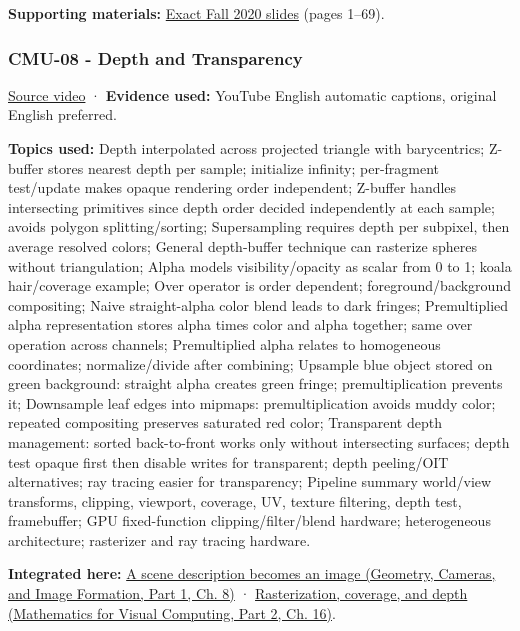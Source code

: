 \textbf{Supporting materials:} \href{https://15462.courses.cs.cmu.edu/fall2020content/lectures/07_texture/07_texture_slides.pdf}{Exact Fall 2020 slides} (pages 1--69).

\subsubsection{CMU-08 - Depth and Transparency}\label{04-visual-computing-ii-ch036-cmu-08---depth-and-transparency}

\hypertarget{04-visual-computing-ii-ch036-cmu-08---depth-and-transparency}{}

\href{https://www.youtube.com/watch?v=WtYfF48Z9mA}{Source video} · \textbf{Evidence used:} YouTube English automatic captions, original English preferred.

\textbf{Topics used:} Depth interpolated across projected triangle with barycentrics; Z-buffer stores nearest depth per sample; initialize infinity; per-fragment test/update makes opaque rendering order independent; Z-buffer handles intersecting primitives since depth order decided independently at each sample; avoids polygon splitting/sorting; Supersampling requires depth per subpixel, then average resolved colors; General depth-buffer technique can rasterize spheres without triangulation; Alpha models visibility/opacity as scalar from 0 to 1; koala hair/coverage example; Over operator is order dependent; foreground/background compositing; Naive straight-alpha color blend leads to dark fringes; Premultiplied alpha representation stores alpha times color and alpha together; same over operation across channels; Premultiplied alpha relates to homogeneous coordinates; normalize/divide after combining; Upsample blue object stored on green background: straight alpha creates green fringe; premultiplication prevents it; Downsample leaf edges into mipmaps: premultiplication avoids muddy color; repeated compositing preserves saturated red color; Transparent depth management: sorted back-to-front works only without intersecting surfaces; depth test opaque first then disable writes for transparent; depth peeling/OIT alternatives; ray tracing easier for transparency; Pipeline summary world/view transforms, clipping, viewport, coverage, UV, texture filtering, depth test, framebuffer; GPU fixed-function clipping/filter/blend hardware; heterogeneous architecture; rasterizer and ray tracing hardware.

\textbf{Integrated here:} \href{../03-Geometry-Cameras-and-Image-Formation-P01/main.pdf\#nameddest=03-visual-computing-i-ch001-a-scene-description-becomes-an-image}{A scene description becomes an image (Geometry, Cameras, and Image Formation, Part 1, Ch. 8)} · \href{../02-Mathematics-for-Visual-Computing-P02/main.pdf\#nameddest=03-visual-computing-i-ch012-rasterization-coverage-and-depth}{Rasterization, coverage, and depth (Mathematics for Visual Computing, Part 2, Ch. 16)}.

